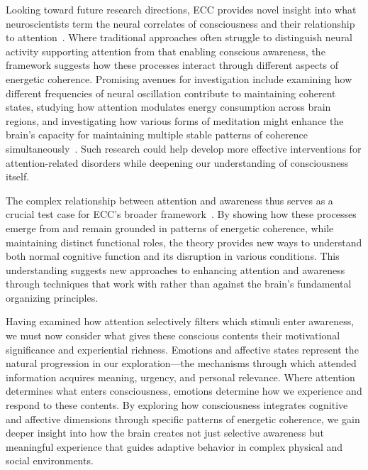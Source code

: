 Looking toward future research directions, ECC provides novel insight into what neuroscientists term the neural correlates of consciousness and their relationship to attention~\cite{seth2024conscious}. Where traditional approaches often struggle to distinguish neural activity supporting attention from that enabling conscious awareness, the framework suggests how these processes interact through different aspects of energetic coherence. Promising avenues for investigation include examining how different frequencies of neural oscillation contribute to maintaining coherent states, studying how attention modulates energy consumption across brain regions, and investigating how various forms of meditation might enhance the brain's capacity for maintaining multiple stable patterns of coherence simultaneously~\cite{van2025processes}. Such research could help develop more effective interventions for attention-related disorders while deepening our understanding of consciousness itself.

The complex relationship between attention and awareness thus serves as a crucial test case for ECC's broader framework~\cite{dennett1992time}. By showing how these processes emerge from and remain grounded in patterns of energetic coherence, while maintaining distinct functional roles, the theory provides new ways to understand both normal cognitive function and its disruption in various conditions. This understanding suggests new approaches to enhancing attention and awareness through techniques that work with rather than against the brain's fundamental organizing principles.

Having examined how attention selectively filters which stimuli enter awareness, we must now consider what gives these conscious contents their motivational significance and experiential richness. Emotions and affective states represent the natural progression in our exploration—the mechanisms through which attended information acquires meaning, urgency, and personal relevance. Where attention determines what enters consciousness, emotions determine how we experience and respond to these contents. By exploring how consciousness integrates cognitive and affective dimensions through specific patterns of energetic coherence, we gain deeper insight into how the brain creates not just selective awareness but meaningful experience that guides adaptive behavior in complex physical and social environments.

